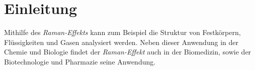 \documentclass[../bericht.tex]{subfiles}
\begin{document}
  \chapter{Einleitung}

    Mithilfe des \textit{Raman-Effekts} kann zum Beispiel die Struktur von Festkörpern, Flüssigkeiten und Gasen analysiert werden. Neben dieser Anwendung in der Chemie und Biologie findet der \textit{Raman-Effekt} auch in der Biomedizin, sowie der Biotechnologie und Pharmazie seine Anwendung.   
\end{document}

